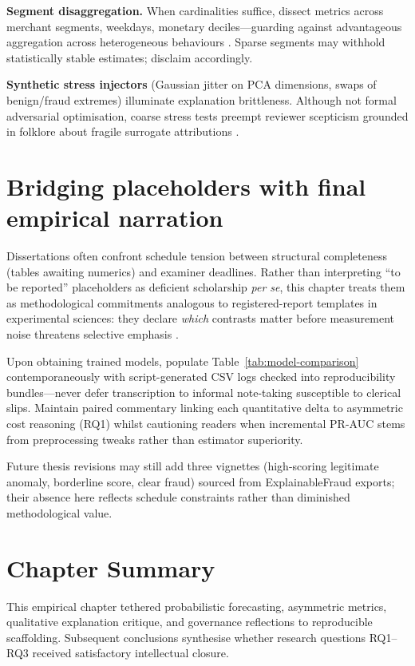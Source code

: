\textbf{Segment disaggregation.} When cardinalities suffice, dissect metrics across merchant segments, weekdays, monetary deciles—guarding against advantageous aggregation across heterogeneous behaviours \cite{lucas_jurgovsky_ccfraud_survey2020}. Sparse segments may withhold statistically stable estimates; disclaim accordingly.

\textbf{Synthetic stress injectors} (Gaussian jitter on PCA dimensions, swaps of benign/fraud extremes) illuminate explanation brittleness. Although not formal adversarial optimisation, coarse stress tests preempt reviewer scepticism grounded in folklore about fragile surrogate attributions \cite{xai_survey}.

\section{Bridging placeholders with final empirical narration}
Dissertations often confront schedule tension between structural completeness (tables awaiting numerics) and examiner deadlines. Rather than interpreting ``to be reported'' placeholders as deficient scholarship \emph{per se}, this chapter treats them as methodological commitments analogous to registered-report templates in experimental sciences: they declare \emph{which} contrasts matter before measurement noise threatens selective emphasis \cite{fraud_handbook}.

Upon obtaining trained models, populate Table~\ref{tab:model-comparison} contemporaneously with script-generated CSV logs checked into reproducibility bundles—never defer transcription to informal note-taking susceptible to clerical slips. Maintain paired commentary linking each quantitative delta to asymmetric cost reasoning (RQ1) whilst cautioning readers when incremental PR-AUC stems from preprocessing tweaks rather than estimator superiority.

Future thesis revisions may still add three vignettes (high-scoring legitimate anomaly, borderline score, clear fraud) sourced from ExplainableFraud exports; their absence here reflects schedule constraints rather than diminished methodological value.

\section{Chapter Summary}
This empirical chapter tethered probabilistic forecasting, asymmetric metrics, qualitative explanation critique, and governance reflections to reproducible scaffolding. Subsequent conclusions synthesise whether research questions RQ1--RQ3 received satisfactory intellectual closure.